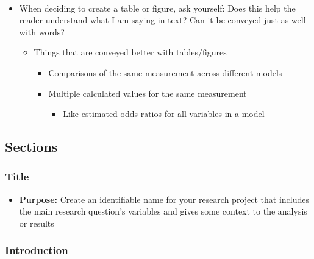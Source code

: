 \documentclass[
  letterpaper,
  DIV=11,
  numbers=noendperiod]{scrartcl}
\providecommand{\tightlist}{%
  \setlength{\itemsep}{0pt}\setlength{\parskip}{0pt}}\usepackage{longtable,booktabs,array}
\begin{document}
~

\begin{itemize}
\tightlist
\item
  When deciding to create a table or figure, ask yourself: Does this
  help the reader understand what I am saying in text? Can it be
  conveyed just as well with words?

  \begin{itemize}
  \tightlist
  \item
    Things that are conveyed better with tables/figures

    \begin{itemize}
    \tightlist
    \item
      Comparisons of the same measurement across different models
    \item
      Multiple calculated values for the same measurement

      \begin{itemize}
      \tightlist
      \item
        Like estimated odds ratios for all variables in a model
      \end{itemize}
    \end{itemize}
  \end{itemize}
\end{itemize}

\subsection{Sections}\label{sections}

\subsubsection{Title}\label{title}

\begin{itemize}
\tightlist
\item
  \textbf{Purpose:} Create an identifiable name for your research
  project that includes the main research question's variables and gives
  some context to the analysis or results
\end{itemize}

\subsubsection{Introduction}\label{introduction}
\end{document}
